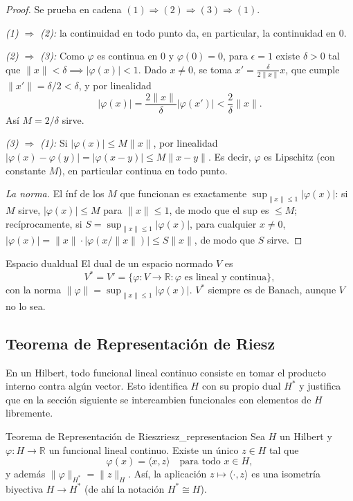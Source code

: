 \documentclass[11pt, a4paper]{article}
\begin{document}
\begin{proof}
Se prueba en cadena $(1) \Rightarrow (2) \Rightarrow (3) \Rightarrow (1)$.

\textit{(1) $\Rightarrow$ (2):} la continuidad en todo punto da, en particular, la continuidad en
$0$.

\textit{(2) $\Rightarrow$ (3):} Como $\varphi$ es continua en $0$ y $\varphi(0) = 0$, para
$\epsilon = 1$ existe $\delta > 0$ tal que $\|x\| < \delta \implies |\varphi(x)| < 1$. Dado
$x \ne 0$, se toma $x' = \tfrac{\delta}{2 \|x\|} x$, que cumple $\|x'\| = \delta/2 < \delta$, y por
linealidad
$$ |\varphi(x)| = \frac{2\|x\|}{\delta} |\varphi(x')| < \frac{2}{\delta} \|x\|. $$
Así $M = 2/\delta$ sirve.

\textit{(3) $\Rightarrow$ (1):} Si $|\varphi(x)| \le M \|x\|$, por linealidad
$|\varphi(x) - \varphi(y)| = |\varphi(x - y)| \le M \|x - y\|$. Es decir, $\varphi$ es Lipschitz
(con constante $M$), en particular continua en todo punto.

\textit{La norma.} El ínf de los $M$ que funcionan es exactamente
$\sup_{\|x\| \le 1} |\varphi(x)|$: si $M$ sirve, $|\varphi(x)| \le M$ para $\|x\| \le 1$, de modo que
el sup es $\le M$; recíprocamente, si $S = \sup_{\|x\|\le 1} |\varphi(x)|$, para cualquier
$x \ne 0$, $|\varphi(x)| = \|x\| \cdot |\varphi(x/\|x\|)| \le S \|x\|$, de modo que $S$ sirve.
\end{proof}

\begin{definicion}{Espacio dual}{dual}
El dual de un espacio normado $V$ es
$$ V^* = V' = \{ \varphi: V \to \mathbb{R} : \varphi \text{ es lineal y continua} \}, $$
con la norma $\|\varphi\| = \sup_{\|x\| \le 1} |\varphi(x)|$. $V^*$ siempre es de Banach, aunque $V$
no lo sea.
\end{definicion}

\subsection{Teorema de Representación de Riesz}

En un Hilbert, todo funcional lineal continuo consiste en tomar el producto interno contra algún
vector. Esto identifica $H$ con su propio dual $H^*$ y justifica que en la sección siguiente se
intercambien funcionales con elementos de $H$ libremente.

\begin{teorema}{Teorema de Representación de Riesz}{riesz_representacion}
Sea $H$ un Hilbert y $\varphi: H \to \mathbb{R}$ un funcional lineal continuo. Existe un único
$z \in H$ tal que
$$ \varphi(x) = \langle x, z \rangle \quad \text{para todo } x \in H, $$
y además $\|\varphi\|_{H^*} = \|z\|_H$. Así, la aplicación
$z \mapsto \langle \cdot, z \rangle$ es una isometría biyectiva $H \to H^*$ (de ahí la
notación $H^* \cong H$).
\end{teorema}
\end{document}
